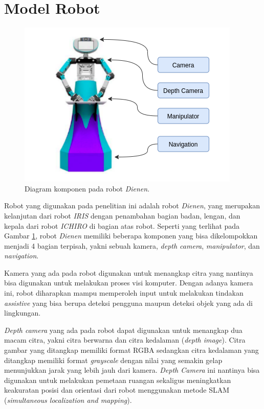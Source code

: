 \section{Model Robot}
\label{sec:modelrobot}

\begin{figure} [ht]
  \centering
  \includegraphics[scale=0.5]{gambar/komponen-robot.png}
  \caption{Diagram komponen pada robot \emph{Dienen}.}
  \label{fig:komponenrobot}
\end{figure}

Robot yang digunakan pada penelitian ini adalah robot \emph{Dienen},
  yang merupakan kelanjutan dari robot \emph{IRIS} \citep{cit:dikairono2020}\citep{cit:zanuar2019} dengan penambahan bagian badan, lengan, dan kepala dari robot \emph{ICHIRO} \citep{cit:muhtadin2019} di bagian atas robot.
Seperti yang terlihat pada Gambar \ref{fig:komponenrobot},
  robot \emph{Dienen} memiliki beberapa komponen yang bisa dikelompokkan menjadi 4 bagian terpisah, yakni sebuah kamera, \emph{depth camera}, \emph{manipulator}, dan \emph{navigation}.

Kamera yang ada pada robot digunakan untuk menangkap citra yang nantinya bisa digunakan untuk melakukan proses visi komputer.
Dengan adanya kamera ini, robot diharapkan mampu memperoleh input untuk melakukan tindakan \emph{assistive} yang bisa berupa deteksi pengguna maupun deteksi objek yang ada di lingkungan.

\emph{Depth camera} yang ada pada robot dapat digunakan untuk menangkap dua macam citra,
  yakni citra berwarna dan citra kedalaman (\emph{depth image}).
Citra gambar yang ditangkap memiliki format RGBA sedangkan citra kedalaman yang ditangkap memiliki format \emph{grayscale} dengan nilai yang semakin gelap menunjukkan jarak yang lebih jauh dari kamera.
\emph{Depth Camera} ini nantinya bisa digunakan untuk melakukan pemetaan ruangan sekaligus meningkatkan keakuratan posisi dan orientasi dari robot menggunakan metode SLAM (\emph{simultaneous localization and mapping}).

